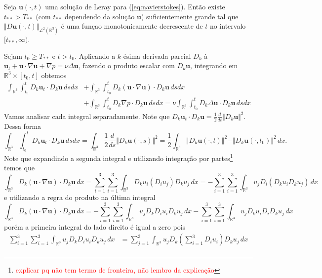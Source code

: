 \documentclass[a4paper, 11pt]{book}
\theoremstyle{definition}
\newcommand{\bR}{\mathbb{R}}
\newcommand{\bu}{\mathbf{u}}
\newcommand{\cL}{\mathcal{L}}
\begin{document}
\begin{pbox} \label{pr:tstar}
    Seja $\bu(\cdot,t)$ uma solução de Leray para (\ref{eq:navierstokes}). Então existe $t_{**} > T_{**}$ (com $t_{**}$ dependendo da solução $\bu$) suficientemente grande tal que $\Vert D\bu(\cdot,t) \Vert_{\cL^2(\bR^3)}$ é uma funçao monotonicamente decrescente de $t$ no intervalo $[t_{**}, \infty)$.
\end{pbox}
\begin{prf}
    Sejam $t_0 \geqslant T_{**}$ e $t > t_0$.
    Aplicando a $k$-ésima derivada parcial $D_k$ à $\bu_t + \bu \cdot \nabla \bu + \nabla p = \nu \Delta \bu$, fazendo o produto escalar com $D_k \bu$, integrando em $\bR^3 \times [t_0,t]$ obtemos
    \begin{equation} \label{eq:A}
        \begin{aligned}
            \int_{\bR^3} \int_{t_0}^t D_k \bu_t \cdot D_k \bu \,dsdx &+ \int_{\bR^3} \int_{t_0}^t D_k (\bu \cdot \nabla \bu) \cdot D_k \bu \,dsdx\\ 
            &+ \int_{\bR^3} \int_{t_0}^t D_k \nabla p \cdot D_k\bu \,dsdx = \nu \int_{\bR^3} \int_{t_0}^t D_k \Delta \bu \cdot D_k \bu \,dsdx
        \end{aligned}
    \end{equation}
    Vamos analisar cada integral separadamente.
    Note que $D_k \bu_t \cdot D_k \bu = \frac{1}{2} \frac{d}{dt} \Vert D_k \bu \Vert^2$.
    Dessa forma 
    \[
        \int_{\bR^3} \int_{t_0}^t D_k \bu_t \cdot D_k \bu \,dsdx = \int_{\bR^3} \frac{1}{2} \frac{d}{ds} \Vert D_k \bu(\cdot,s) \Vert^2 =  \frac{1}{2} \int_{\bR^3} \Vert D_k \bu(\cdot,t) \Vert^2 -  \Vert D_k \bu(\cdot,t_0) \Vert^2 \,dx.
    \]
    Note que expandindo a segunda integral e utilizando integração por partes\footnote{\textcolor{red}{explicar pq não tem termo de fronteira, não lembro da explicação}} temos que
    \[
        \int_{\bR^3} D_k ( \bu \cdot \nabla \bu) \cdot D_k \bu \,dx = \sum_{i=1}^3 \sum_{i=1}^3 \int_{\bR^3} D_k u_i (D_i u_j) D_k u_j \,dx = -\sum_{i=1}^3 \sum_{i=1}^3 \int_{\bR^3} u_j D_i (D_k u_i D_k u_j) \,dx
    \]
    e utilizando a regra do produto na última integral
    \[
        \int_{\bR^3} D_k ( \bu \cdot \nabla \bu) \cdot D_k \bu \,dx = -\sum_{i=1}^3 \sum_{i=1}^3 \int_{\bR^3} u_j D_k D_i u_i D_k u_j \,dx -\sum_{i=1}^3 \sum_{i=1}^3 \int_{\bR^3} u_j D_k u_i D_i D_k u_j \,dx
    \]
    porém a primeira integral do lado direito é igual a zero pois
    \[
        \begin{aligned}
            \sum_{i=1}^3 \sum_{i=1}^3 \int_{\bR^3} u_j D_k D_i u_i D_k u_j \,dx &= \sum_{j=1}^3 \int_{\bR^3}  u_j D_k \left( \sum_{i=1}^3 D_i u_i \right) D_k u_j  \,dx\\

\end{aligned}\]
\end{prf}
\end{document}
